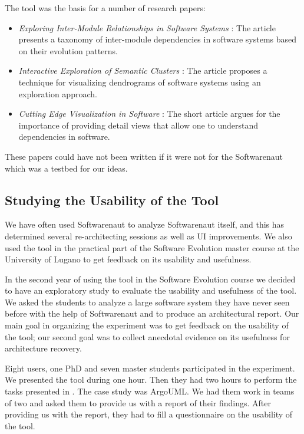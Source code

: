 \documentclass[preprint,12pt]{elsarticle}
\begin{document}
The tool was the basis for a number of research papers: 
\begin{itemize}
\item {\em Exploring Inter-Module Relationships in Software Systems} \cite{lungu-relevo}: The article presents a taxonomy of inter-module dependencies in software systems based on their evolution patterns.
\item {\em Interactive Exploration of Semantic Clusters} \cite{lungu-clust}: The article proposes a technique for visualizing dendrograms of software systems using an exploration approach.
\item {\em Cutting Edge Visualization in Software} \cite{lungu-cutedge}: The short article argues for the importance of providing detail views that allow one to understand dependencies in software.
\end{itemize}

These papers could have not been written if it were not for the Softwarenaut which was a testbed for our ideas. 


\subsection {Studying the Usability of the Tool}
\label{sec:usability}
We have often used Softwarenaut to analyze Softwarenaut itself, and this has determined several re-architecting sessions as well as UI improvements. We also used the tool in the practical part of the Software Evolution master course at the University of Lugano to get feedback on its usability and usefulness. 

In the second year of using the tool in the Software Evolution course we decided to have an exploratory study to evaluate the usability and usefulness of the tool. We asked the students to analyze a large software system they have never seen before with the help of Softwarenaut and to produce an architectural report. Our main goal in organizing the experiment was to get feedback on the usability of the tool; our second goal was to collect anecdotal evidence on its usefulness for architecture recovery.

Eight users, one PhD and seven master students participated in the experiment. We presented the tool during one hour. Then they had two hours to perform the tasks presented in . The case study was ArgoUML. We had them work in teams of two and asked them to provide us with a report of their findings. After providing us with the report, they had to fill a questionnaire on the usability of the tool. 
\end{document}
